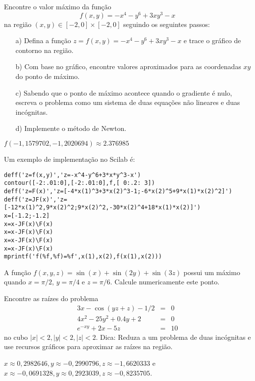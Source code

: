 \begin{exer}Encontre o valor máximo da função \begin{equation} f(x,y)=-x^4-y^6+3xy^3-x \end{equation} na região $(x,y)\in [-2,0]\times [-2,0]$
 seguindo os seguintes passos:
\begin{itemize}
  \item[a)] Defina a função $z=f(x,y)=-x^4-y^6+3xy^3-x$ e trace o gráfico de contorno na região.
  \item[b)] Com base no gráfico, encontre valores aproximados para as coordenadas $xy$ do ponto de máximo.
  \item[c)] Sabendo que o ponto de máximo acontece quando o gradiente é nulo, escreva o problema como um sistema de duas equações não lineares e duas incógnitas.
  \item[d)] Implemente o método de Newton.
\end{itemize}
\end{exer}
 \begin{resp}
 $f(-1,1579702, -1,2020694)\approx 2.376985$

\ifisscilab
Um exemplo de implementação no Scilab é:
\begin{verbatim}
deff('z=f(x,y)','z=-x^4-y^6+3*x*y^3-x')
contour([-2:.01:0],[-2:.01:0],f,[ 0:.2: 3])
deff('z=F(x)','z=[-4*x(1)^3+3*x(2)^3-1;-6*x(2)^5+9*x(1)*x(2)^2]')
deff('z=JF(x)','z=[-12*x(1)^2,9*x(2)^2;9*x(2)^2,-30*x(2)^4+18*x(1)*x(2)]')
x=[-1.2;-1.2]
x=x-JF(x)\F(x)
x=x-JF(x)\F(x)
x=x-JF(x)\F(x)
x=x-JF(x)\F(x)
mprintf('f(%f,%f)=%f',x(1),x(2),f(x(1),x(2)))
\end{verbatim}
\fi
\end{resp}

\begin{exer}A função $f(x,y,z)=\sin(x)+\sin(2y)+\sin(3z)$ possui um máximo quando $x=\pi/2$, $y=\pi/4$ e $z=\pi/6$. Calcule numericamente este ponto.
\end{exer}
\begin{resp}
  \construirResp
\end{resp}


\begin{exer}\label{prob_sis3} Encontre as raízes do problema
  \begin{eqnarray}
    3x-\cos(yz+z)-1/2&=&0\\
    4x^2-25y^2+0.4y+2&=&0\\
    e^{-xy}+2x-5z&=&10
  \end{eqnarray}
  no cubo $|x|<2, |y|<2, |z|<2.$
  Dica: Reduza a um problema de duas incógnitas e use recursos gráficos para aproximar as raízes na região.
\end{exer}
\begin{resp}
  $x\approx 0,2982646, y\approx -0,2990796, z\approx- 1,6620333$  e $x\approx -0,0691328, y\approx 0,2923039, z\approx -0,8235705$.
\end{resp}


